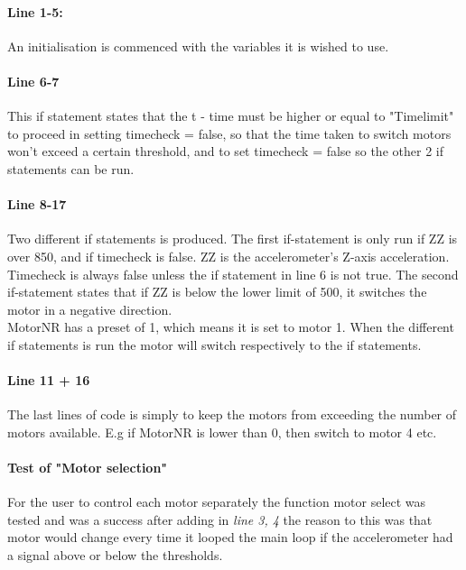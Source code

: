 \paragraph{Line 1-5:} An initialisation is commenced with the variables it is wished to use.
\paragraph{Line 6-7} This if statement states that the t - time must be higher or equal to "Timelimit" to proceed in setting timecheck = false, so that the time taken to switch motors won't exceed a certain threshold, and to set timecheck = false so the other 2 if statements can be run.
\paragraph{Line 8-17}Two different if statements is produced. The first if-statement is only run if ZZ is over 850, and if timecheck is false. ZZ is the accelerometer's Z-axis acceleration. Timecheck is always false unless the if statement in line 6 is not true. The second if-statement states that if ZZ is below the lower limit of 500, it switches the motor in a negative direction.\\
MotorNR has a preset of 1, which means it is set to motor 1. When the different if statements is run the motor will switch respectively to the if statements.
\paragraph{Line 11 + 16}The last lines of code is simply to keep the motors from exceeding the number of motors available. E.g if MotorNR is lower than 0, then switch to motor 4 etc.
\paragraph{Test of "Motor selection"}
For the user to control each motor separately the function motor select was tested and was a success after adding in \textit{line 3, 4} the reason to this was that motor would change every time it looped the main loop if the accelerometer had a signal above or below the thresholds.  

